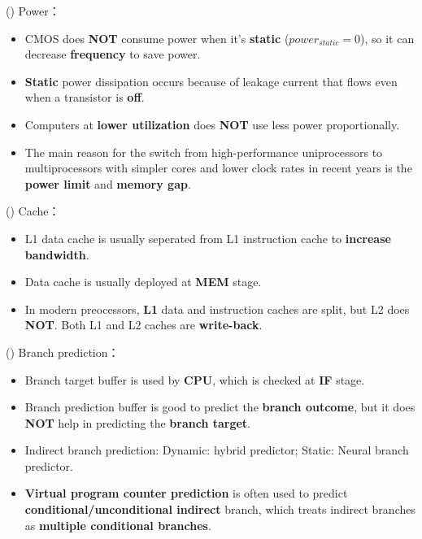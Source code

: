 \item \begin{theorem}{()} Power： \begin{itemize}
        \item CMOS does \textbf{NOT} consume power when it's \textbf{static} ($power_{static} = 0$), so it can decrease \textbf{frequency} to save power.
        \item \textbf{Static} power dissipation occurs because of leakage current that flows even when a transistor is \textbf{off}.
        \item Computers at \textbf{lower utilization} does \textbf{NOT} use less power proportionally.
        \item The main reason for the switch from high-performance uniprocessors to multiprocessors with simpler cores and lower clock rates in recent years is the \textbf{power limit} and \textbf{memory gap}.
    \end{itemize}
\end{theorem}

\item \begin{theorem}{()} Cache： \begin{itemize}
        \item L1 data cache is usually seperated from L1 instruction cache to \textbf{increase bandwidth}.
        \item Data cache is usually deployed at \textbf{MEM} stage.
        \item In modern preocessors, \textbf{L1} data and instruction caches are split, but L2 does \textbf{NOT}. Both L1 and L2 caches are \textbf{write-back}.
    \end{itemize}
\end{theorem}

\item \begin{theorem}{()} Branch prediction： \begin{itemize}
        \item Branch target buffer is used by \textbf{CPU}, which is checked at \textbf{IF} stage.
        \item Branch prediction buffer is good to predict the \textbf{branch outcome}, but it does \textbf{NOT} help in predicting the \textbf{branch target}.
        \item Indirect branch prediction: Dynamic: hybrid predictor; Static: Neural branch predictor.
        \item \textbf{Virtual program counter prediction} is often used to predict \textbf{conditional/unconditional indirect} branch, which treats indirect branches as \textbf{multiple conditional branches}.
    \end{itemize}
\end{theorem}

